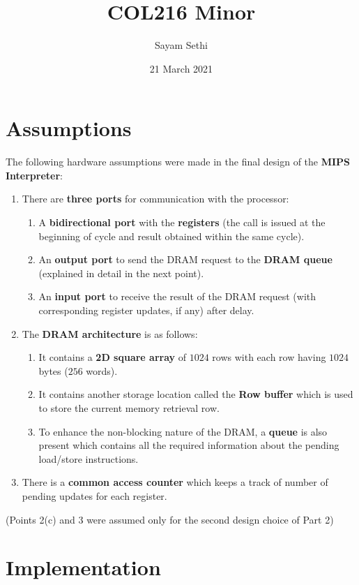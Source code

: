 \documentclass{article}
\title{COL216 Minor}
\author{Sayam Sethi}
\date{21 March 2021}
\begin{document}
\maketitle

\section{Assumptions}
The following hardware assumptions were made in the final design of the \textbf{MIPS Interpreter}:
\begin{enumerate}
    \item There are \textbf{three ports} for communication with the processor:
        \begin{enumerate}
            \item A \textbf{bidirectional port} with the \textbf{registers} (the call is issued at the beginning of cycle and result obtained within the same cycle).
            \item An \textbf{output port} to send the DRAM request to the \textbf{DRAM queue} (explained in detail in the next point).
            \item An \textbf{input port} to receive the result of the DRAM request (with corresponding register updates, if any) after delay.
        \end{enumerate}
    \item The \textbf{DRAM architecture} is as follows:
        \begin{enumerate}
            \item It contains a \textbf{2D square array} of $1024$ rows with each row having $1024$ bytes ($256$ words).
            \item It contains another storage location called the \textbf{Row buffer} which is used to store the current memory retrieval row.
            \item To enhance the non-blocking nature of the DRAM, a \textbf{queue} is also present which contains all the required information about the pending load/store instructions.
        \end{enumerate}
    \item There is a \textbf{common access counter} which keeps a track of number of pending updates for each register.
\end{enumerate}
(Points 2(c) and 3 were assumed only for the second design choice of Part 2)


\section{Implementation}
\end{document}
